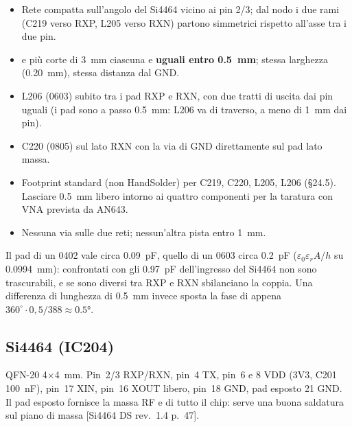 \documentclass[a4paper,10pt]{article}
\newcommand{\net}[1]{\texttt{\detokenize{#1}}}
\newcommand{\fonte}[1]{{\footnotesize\color{sbgray}[#1]}}
\newcounter{regola}
\begin{document}
\begin{regola}[rete AN643]
\begin{itemize}
\item Rete compatta sull'angolo del Si4464 vicino ai pin 2/3; dal nodo \net{RF_RX_MATCH} i due rami
      (C219 verso RXP, L205 verso RXN) partono simmetrici rispetto all'asse tra i due pin.
\item \net{RF_RX_P} e \net{RF_RX_N} più corte di \SI{3}{mm} ciascuna e \textbf{uguali entro
      \SI{0.5}{mm}}; stessa larghezza (\SI{0.20}{mm}), stessa distanza dal GND.
\item L206 (0603) subito tra i pad RXP e RXN, con due tratti di uscita dai pin uguali (i pad sono a
      passo \SI{0.5}{mm}: L206 va di traverso, a meno di \SI{1}{mm} dai pin).
\item C220 (0805) sul lato RXN con la via di GND direttamente sul pad lato massa.
\item Footprint standard (non HandSolder) per C219, C220, L205, L206 (\S24.5). Lasciare \SI{0.5}{mm} libero
      intorno ai quattro componenti per la taratura con VNA prevista da AN643.
\item Nessuna via sulle due reti; nessun'altra pista entro \SI{1}{mm}.
\end{itemize}
\end{regola}

\begin{perche}
Il pad di un 0402 vale circa \SI{0.09}{pF}, quello di un 0603 circa \SI{0.2}{pF}
($\varepsilon_0\varepsilon_rA/h$ su \SI{0.0994}{mm}): confrontati con gli \SI{0.97}{pF} dell'ingresso del
Si4464 non sono trascurabili, e se sono diversi tra RXP e RXN sbilanciano la coppia. Una differenza di
lunghezza di \SI{0.5}{mm} invece sposta la fase di appena $360^\circ\cdot0{,}5/388\approx\ang{0.5}$.
\end{perche}

\subsection{Si4464 (IC204)}
\label{sec:si}
QFN-20 \SI{4}{}$\times$\SI{4}{mm}. Pin~2/3 RXP/RXN, pin~4 TX, pin~6 e 8 VDD (3V3, C201 \SI{100}{nF}),
pin~17 XIN, pin~16 XOUT libero, pin~18 GND, pad esposto 21 GND. Il pad esposto fornisce la massa RF e
di tutto il chip: serve una buona saldatura sul piano di massa \fonte{Si4464 DS rev.~1.4 p.~47}.
\end{document}
